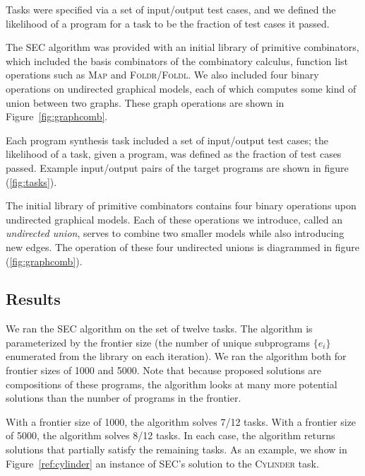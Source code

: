 \documentclass{article} %
\begin{document}
Tasks were specified via a set of input/output test cases, and we defined the likelihood of a program for a task to be the fraction of test cases it passed. 

The SEC algorithm was provided with an initial library of primitive  combinators, which included the basis combinators of the combinatory calculus, function list operations such as \textsc{Map} and \textsc{Foldr}/\textsc{Foldl}. We also included four binary operations on undirected graphical models, each of which computes some kind of union between two graphs. These graph operations are shown in Figure~\ref{fig:graphcomb}.

Each program synthesis task included a set of input/output test cases; the likelihood of a task, given a program, was defined as the fraction of test cases passed.
Example input/output pairs of the target programs are shown in figure (\ref{fig:tasks}).

The initial library of primitive combinators contains four binary operations upon undirected graphical models.
Each of these operations we introduce, called an \emph{undirected union}, serves to combine two smaller models while also introducing new edges.
The operation of these four undirected unions is diagrammed in figure (\ref{fig:graphcomb}).



\subsection{Results}

We ran the SEC algorithm on the set of twelve tasks. The algorithm is parameterized by the frontier size (the number of unique subprograms $\{e_i\}$ enumerated from the library on each iteration). We ran the algorithm both for frontier sizes of 1000 and 5000. Note that because proposed solutions are compositions of these programs, the algorithm looks at many more potential solutions than the number of programs in the frontier. 

With a frontier size of 1000, the algorithm solves 7/12 tasks. With a frontier size of 5000, the algorithm solves 8/12 tasks. In each case, the algorithm returns solutions that partially satisfy the remaining tasks. As an example, we show in Figure~\ref{ref:cylinder} an instance of SEC's solution to the \textsc{Cylinder} task. 
\end{document}
